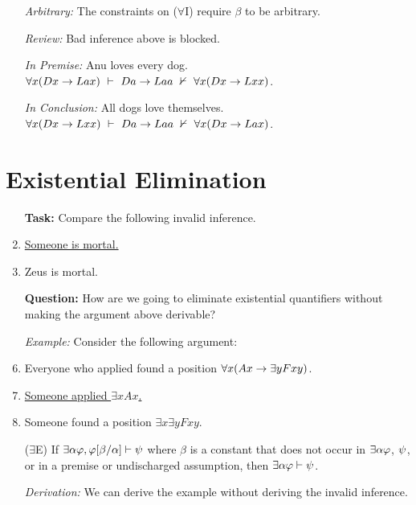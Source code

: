 \documentclass[a4paper, 11pt]{article} %
\begin{document}
\begin{enumerate}
  \item[\it Arbitrary:] The constraints on ($\forall$I) require $\beta$ to be arbitrary. 
  \item[\it Review:] Bad inference above is blocked.
  \item[\it In Premise:] Anu loves every dog.\\
    $\forall x(Dx \eif Lax)\ \vdash\ Da \eif Laa\ \nvdash\ \forall x(Dx \eif Lxx)$.
  \item[\it In Conclusion:] All dogs love themselves.\\
    $\forall x(Dx \eif Lxx)\ \vdash\ Da \eif Laa\ \nvdash\ \forall x(Dx \eif Lax)$.
\end{enumerate}






\section*{Existential Elimination}

\begin{enumerate}
  \item[\bf Task:] Compare the following invalid inference.
    \item \underline{Someone is mortal.\quad\quad}
    \item Zeus is mortal.
  \item[\bf Question:] How are we going to eliminate existential quantifiers without making the argument above derivable?
  \item[\it Example:] Consider the following argument:
    \setcounter{enumi}{0}
    \item Everyone who applied found a position $\forall x(Ax \rightarrow \exists y Fxy)$.
    \item \underline{Someone applied $\exists xAx$.\quad\quad}
    \item Someone found a position $\exists x\exists y Fxy$.
  \item[($\exists$E)] If $\exists\alpha\varphi,\varphi[\beta/\alpha] \vdash \psi$ where $\beta$ is a constant that does not occur in $\exists\alpha\varphi$, $\psi$, or in a premise or undischarged assumption, then $\exists\alpha\varphi\vdash \psi$.
  \item[\it Derivation:] We can derive the example without deriving the invalid inference.
\end{enumerate}
\end{document}
